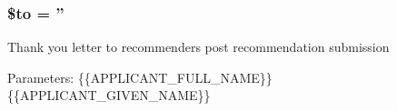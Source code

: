 \hypertarget{reference_thank_you_8email_8php_ac19f839b525d6d99d063fe56bf2a6d3b}{
\subsubsection[{\$to}]{\setlength{\rightskip}{0pt plus 5cm}\$to = ''}}\label{reference_thank_you_8email_8php_ac19f839b525d6d99d063fe56bf2a6d3b}
Thank you letter to recommenders post recommendation submission

Parameters\-: \{\{A\-P\-P\-L\-I\-C\-A\-N\-T\-\_\-\-F\-U\-L\-L\-\_\-\-N\-A\-M\-E\}\} \{\{A\-P\-P\-L\-I\-C\-A\-N\-T\-\_\-\-G\-I\-V\-E\-N\-\_\-\-N\-A\-M\-E\}\} 